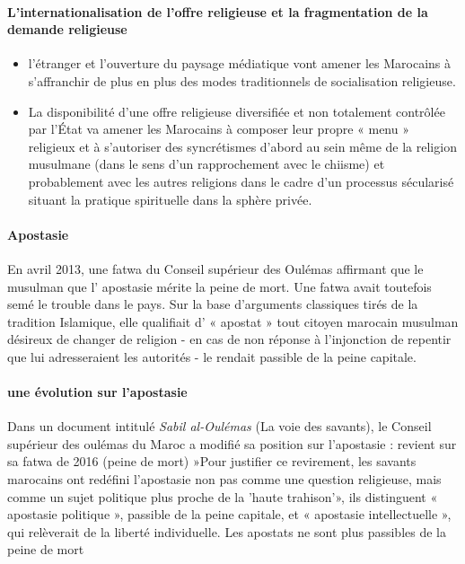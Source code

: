   \paragraph{L'internationalisation de l'offre religieuse et la fragmentation de la 
  demande religieuse}
  \begin{itemize}
      \item l'étranger et l'ouverture du paysage médiatique vont amener les Marocains à s'affranchir de plus en plus des modes traditionnels de socialisation religieuse.
      \item La disponibilité d'une offre religieuse diversifiée et non totalement contrôlée par l'État va amener les Marocains à composer leur propre « menu » religieux et à s'autoriser des syncrétismes d'abord au sein même de la religion musulmane (dans le sens d'un rapprochement avec le chiisme) et probablement avec les autres religions dans le cadre d'un processus sécularisé situant la pratique spirituelle dans la sphère privée.
  \end{itemize}


\paragraph{Apostasie}
 En avril 2013, une fatwa du Conseil supérieur des Oulémas affirmant que le musulman que l' apostasie mérite la peine de mort. 
 Une fatwa avait toutefois semé le trouble dans le pays. Sur la base d'arguments classiques tirés de la tradition Islamique, elle qualifiait d' « apostat » tout citoyen marocain musulman désireux de changer de religion - en cas de non réponse à l'injonction de repentir que lui adresseraient les autorités - le rendait passible de la peine capitale.

\paragraph{une évolution sur l'apostasie}
  Dans un document intitulé \textit{Sabil al-Oulémas} (La voie des savants), le Conseil supérieur des oulémas du Maroc a modifié sa position sur l'apostasie : revient sur sa fatwa de 2016 (peine de mort) »Pour justifier ce revirement, les savants marocains ont redéfini l'apostasie non pas comme une question religieuse, mais comme un sujet politique plus proche de la 'haute trahison'», ils distinguent « apostasie politique », passible de la peine capitale, et « apostasie intellectuelle », qui relèverait de la liberté individuelle.
Les apostats ne sont plus passibles de la peine de mort

